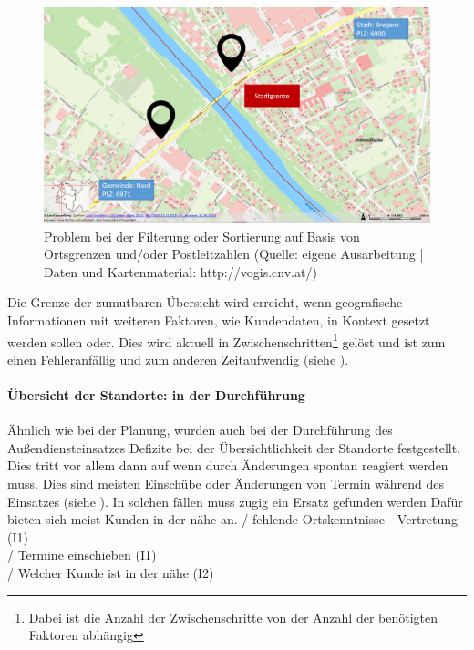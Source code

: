 \documentclass[Bachelorarbeit.tex]{subfiles}
\begin{document}
\begin{figure}[h]
\centering
\includegraphics[width=1\linewidth]{img/Interviews/HarteGrenzen}
\caption[Probleme mit harten Grenzen]{Problem bei der Filterung oder Sortierung auf Basis von Ortsgrenzen und/oder Postleitzahlen (Quelle: eigene Ausarbeitung | Daten und Kartenmaterial: http://vogis.cnv.at/)}
\label{fig:HarteGrenzen}
\end{figure}

Die Grenze der zumutbaren Übersicht wird erreicht, wenn geografische Informationen mit weiteren Faktoren, wie Kundendaten, in Kontext gesetzt werden sollen oder. 
Dies wird aktuell in Zwischenschritten\footnote{Dabei ist die Anzahl der Zwischenschritte von der Anzahl der benötigten Faktoren abhängig} gelöst und ist zum einen Fehleranfällig und zum anderen Zeitaufwendig (siehe ).

\paragraph{Übersicht der Standorte: in der Durchführung}
Ähnlich wie bei der Planung, wurden auch bei der Durchführung des Außendiensteinsatzes Defizite bei der Übersichtlichkeit der Standorte festgestellt. 
Dies tritt vor allem dann auf wenn durch Änderungen spontan reagiert werden muss.
Dies sind meisten Einschübe oder Änderungen von Termin während des Einsatzes (siehe ). 
In solchen fällen muss zugig ein Ersatz gefunden werden
Dafür bieten sich meist Kunden in der nähe an.
/ fehlende Ortskenntnisse - Vertretung (I1) \\
/ Termine einschieben (I1)\\
/ Welcher Kunde ist in der nähe (I2)\\
\end{document}
